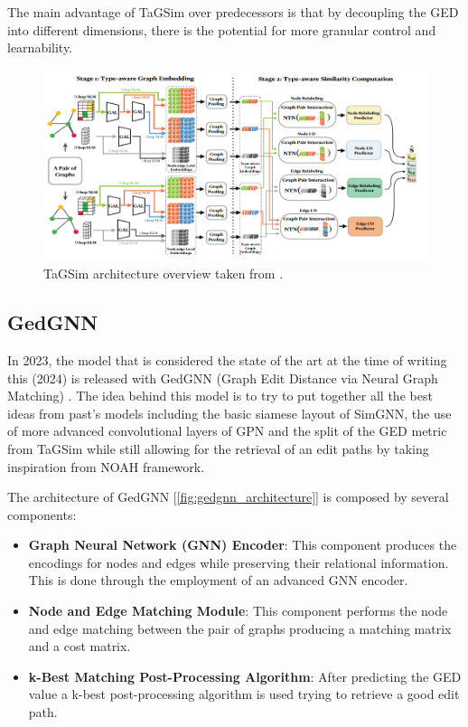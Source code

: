 \documentclass[../Thesis.tex]{subfiles}
\begin{document}
	The main advantage of TaGSim over predecessors is that by decoupling the GED into different dimensions, there is the potential for more granular control and learnability.
	
	\begin{figure}[H]
		\centering
		\includegraphics[width=\textwidth]{Images/tagsim_architecture.png}
		\caption{TaGSim architecture overview taken from \cite{TaGSim_type_aware_graph_similarity_learning_and_computation}.}
		\label{fig:tagsim_architecture}
	\end{figure}

	\subsection{GedGNN}
	\label{sec:gedgnn}
	
	In 2023, the model that is considered the state of the art at the time of writing this (2024) is released with GedGNN (Graph Edit Distance via Neural Graph Matching) \cite{computing_graph_edit_distance_via_neural_graph_matching}. The idea behind this model is to try to put together all the best ideas from past's models including the basic siamese layout of SimGNN, the use of more advanced convolutional layers of GPN and the split of the GED metric from TaGSim while still allowing for the retrieval of an edit paths by taking inspiration from NOAH framework.
	
	The architecture of GedGNN [\autoref{fig:gedgnn_architecture}] is composed by several components:
	
	\begin{itemize}
		\item \textbf{Graph Neural Network (GNN) Encoder}: This component produces the encodings for nodes and edges while preserving their relational information. This is done through the employment of an advanced GNN encoder.
		\item \textbf{Node and Edge Matching Module}: This component performs the node and edge matching between the pair of graphs producing a matching matrix and a cost matrix.
		\item \textbf{k-Best Matching Post-Processing Algorithm}: After predicting the GED value a k-best post-processing algorithm is used trying to retrieve a good edit path.
	\end{itemize}
	
\end{document}
